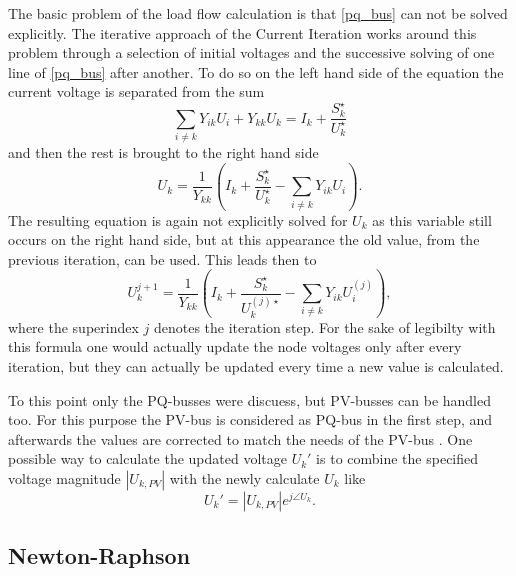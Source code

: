 The basic problem of the load flow calculation is that \eqref{pq_bus} can not be solved explicitly. The iterative approach of the Current Iteration works around this problem through a selection of initial voltages and the successive solving of one line of \eqref{pq_bus} after another. To do so on the left hand side of the equation the current voltage is separated from the sum
\begin{equation}
	\sum_{i \ne k} Y_{ik} U_i + Y_{kk} U_k = I_k + \frac{S_k^\star}{U_k^\star}
\end{equation}
and then the rest is brought to the right hand side
\begin{equation}
	 U_k = \frac{1}{Y_{kk}} \left( I_k + \frac{S_k^\star}{U_k^\star} - \sum_{i \ne k} Y_{ik} U_i \right).
\end{equation}
The resulting equation is again not explicitly solved for $U_k$ as this variable still occurs on the right hand side, but at this appearance the old value, from the previous iteration, can be used. This leads then to
\begin{equation}
	 U_k^{j + 1} = \frac{1}{Y_{kk}} \left( I_k + \frac{S_k^\star}{U_k^{(j) \star}} - \sum_{i \ne k} Y_{ik} U_i^{(j)} \right),
\end{equation}
where the superindex $j$ denotes the iteration step. For the sake of legibilty with this formula one would actually update the node voltages only after every iteration, but they can actually be updated every time a new value is calculated.

To this point only the PQ-busses were discuess, but PV-busses can be handled too. For this purpose the PV-bus is considered as PQ-bus in the first step, and afterwards the values are corrected to match the needs of the PV-bus \citep[p. 211]{powerSystemAnalysis}. One possible way to calculate the updated voltage $U_k'$ is to combine the specified voltage magnitude $|U_{k,PV}|$ with the newly calculate $U_k$ like
\begin{equation}
	U_k' = |U_{k,PV}| e^{j \angle U_k}.
\end{equation}

\subsection{Newton-Raphson}
\label{sec:newton_raphson}

